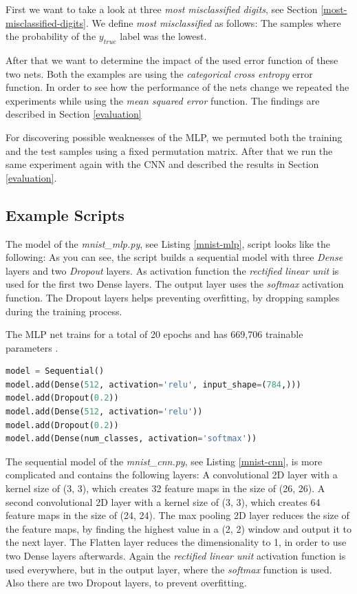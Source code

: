 \documentclass{article}[]
\begin{document}
First we want to take a look at three \emph{most misclassified digits}, see Section \ref{most-misclassified-digits}.
We define \textit{most misclassified} as follows: The samples where the probability of the $y_{true}$ label was the lowest.

After that we want to determine the impact of the used error function of these two nets.
Both the examples are using the \emph{categorical cross entropy} error function.
In order to see how the performance of the nets change we repeated the experiments while using the \emph{mean squared error} function.
The findings are described in Section \ref{evaluation}

For discovering possible weaknesses of the MLP, we permuted both the training and the test samples using a fixed permutation matrix.
After that we run the same experiment again with the CNN and described the results in Section \ref{evaluation}.


\subsection{Example Scripts}
\label{example-scripts}

The model of the \emph{mnist\_mlp.py}, see Listing \ref{mnist-mlp}, script looks like the following:
As you can see, the script builds a sequential model with three \emph{Dense} layers and two \emph{Dropout} layers.
As activation function the \emph{rectified linear unit} is used for the first two Dense layers.
The output layer uses the \emph{softmax} activation function.
The Dropout layers helps preventing overfitting, by dropping samples during the training process.

The MLP net trains for a total of 20 epochs and has 669,706 trainable parameters .

\begin{lstlisting}[language=Python, label=mnist-mlp, caption={mnist\_cnn.py model}, captionpos=b]
model = Sequential()
model.add(Dense(512, activation='relu', input_shape=(784,)))
model.add(Dropout(0.2))
model.add(Dense(512, activation='relu'))
model.add(Dropout(0.2))
model.add(Dense(num_classes, activation='softmax'))
\end{lstlisting}

The sequential model of the \emph{mnist\_cnn.py}, see Listing \ref{mnist-cnn}, is more complicated and contains the following layers:
A convolutional 2D layer with a kernel size of (3, 3), which creates 32 feature maps in the size of (26, 26).
A second convolutional 2D layer with a kernel size of (3, 3), which creates 64 feature maps in the size of (24, 24).
The max pooling 2D layer reduces the size of the feature maps, by finding the highest value in a (2, 2) window and output it to the next layer.
The Flatten layer reduces the dimensionality to 1, in order to use two Dense layers afterwards.
Again the \emph{rectified linear unit} activation function is used everywhere, but in the output layer, where the \emph{softmax} function is used.
Also there are two Dropout layers, to prevent overfitting.
\end{document}
